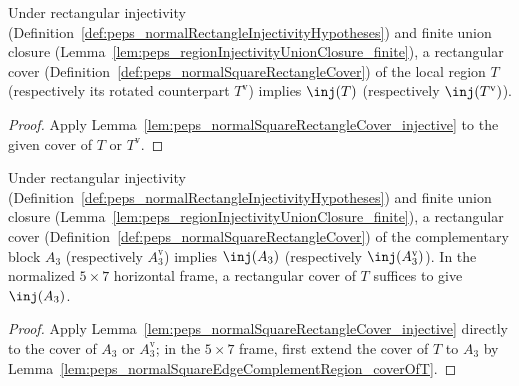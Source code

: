 \begin{lemma}%
    \label{lem:peps_normalSquareRegionT_injective_of_cover}
    \leanok
    Under rectangular injectivity
    (Definition~\ref{def:peps_normalRectangleInjectivityHypotheses}) and finite
    union closure (Lemma~\ref{lem:peps_regionInjectivityUnionClosure_finite}),
    a rectangular cover (Definition~\ref{def:peps_normalSquareRectangleCover})
    of the local region $T$ (respectively its rotated counterpart
    $T^{\mathrm v}$) implies $\inj(T)$ (respectively $\inj(T^{\mathrm v})$).
\end{lemma}
\begin{proof}\leanok
    Apply Lemma~\ref{lem:peps_normalSquareRectangleCover_injective} to the
    given cover of $T$ or $T^{\mathrm v}$.
\end{proof}

\begin{lemma}%
    \label{lem:peps_normalSquareEdgeComplementRegion_injective_of_cover}
    \leanok
    Under rectangular injectivity
    (Definition~\ref{def:peps_normalRectangleInjectivityHypotheses}) and finite
    union closure (Lemma~\ref{lem:peps_regionInjectivityUnionClosure_finite}),
    a rectangular cover (Definition~\ref{def:peps_normalSquareRectangleCover})
    of the complementary block $A_3$ (respectively $A_3^{\mathrm v}$) implies
    $\inj(A_3)$ (respectively $\inj(A_3^{\mathrm v})$). In the normalized
    $5\times 7$ horizontal frame, a rectangular cover of $T$ suffices to give
    $\inj(A_3)$.
\end{lemma}
\begin{proof}\leanok
    Apply Lemma~\ref{lem:peps_normalSquareRectangleCover_injective} directly to
    the cover of $A_3$ or $A_3^{\mathrm v}$; in the $5\times 7$ frame, first
    extend the cover of $T$ to $A_3$ by
    Lemma~\ref{lem:peps_normalSquareEdgeComplementRegion_coverOfT}.
\end{proof}

